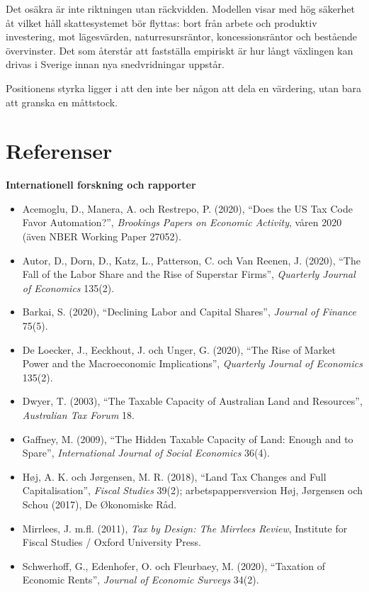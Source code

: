 \documentclass[11pt]{article}
\begin{document}
Det osäkra är inte riktningen utan räckvidden. Modellen visar med hög säkerhet åt vilket håll skattesystemet bör flyttas: bort från arbete och produktiv investering, mot lägesvärden, naturresursräntor, koncessionsräntor och bestående övervinster. Det som återstår att fastställa empiriskt är hur långt växlingen kan drivas i Sverige innan nya snedvridningar uppstår.

Positionens styrka ligger i att den inte ber någon att dela en värdering, utan bara att granska en måttstock.

\section*{Referenser}

\textbf{Internationell forskning och rapporter}
\begin{itemize}
\item Acemoglu, D., Manera, A. och Restrepo, P. (2020), \enquote{Does the US Tax Code Favor Automation?}, \textit{Brookings Papers on Economic Activity}, våren 2020 (även NBER Working Paper 27052).
\item Autor, D., Dorn, D., Katz, L., Patterson, C. och Van Reenen, J. (2020), \enquote{The Fall of the Labor Share and the Rise of Superstar Firms}, \textit{Quarterly Journal of Economics} 135(2).
\item Barkai, S. (2020), \enquote{Declining Labor and Capital Shares}, \textit{Journal of Finance} 75(5).
\item De Loecker, J., Eeckhout, J. och Unger, G. (2020), \enquote{The Rise of Market Power and the Macroeconomic Implications}, \textit{Quarterly Journal of Economics} 135(2).
\item Dwyer, T. (2003), \enquote{The Taxable Capacity of Australian Land and Resources}, \textit{Australian Tax Forum} 18.
\item Gaffney, M. (2009), \enquote{The Hidden Taxable Capacity of Land: Enough and to Spare}, \textit{International Journal of Social Economics} 36(4).
\item Høj, A. K. och Jørgensen, M. R. (2018), \enquote{Land Tax Changes and Full Capitalisation}, \textit{Fiscal Studies} 39(2); arbetspappersversion Høj, Jørgensen och Schou (2017), De Økonomiske Råd.
\item Mirrlees, J. m.fl. (2011), \textit{Tax by Design: The Mirrlees Review}, Institute for Fiscal Studies / Oxford University Press.
\item Schwerhoff, G., Edenhofer, O. och Fleurbaey, M. (2020), \enquote{Taxation of Economic Rents}, \textit{Journal of Economic Surveys} 34(2).
\end{itemize}
\end{document}
